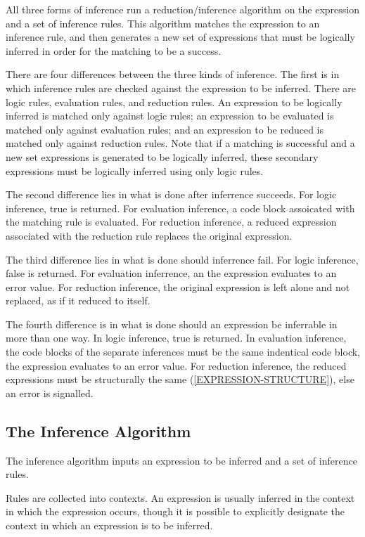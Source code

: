\documentclass[12pt]{article}
\begin{document}
All three forms of inference run a reduction/inference algorithm on the
expression and a set of inference rules.  This algorithm matches
the expression to an inference rule, and then generates a new set of
expressions that must be logically inferred in order for the matching
to be a success.

There are four differences between the three kinds of inference.
The first is in which inference rules are checked against the expression
to be inferred.  There are logic rules, evaluation rules, and reduction
rules.  An expression to be logically inferred is matched only against
logic rules; an expression to be evaluated is matched only against
evaluation rules; and an expression to be reduced is matched only
against reduction rules.  Note that if a matching is successful and a new set
expressions is generated to be logically inferred, these secondary
expressions must be logically inferred using only logic rules.

The second difference lies in what is done after inferrence succeeds.
For logic inference, true is returned.  For evaluation inference, a code
block assoicated with the matching rule is evaluated.  For reduction
inference, a reduced expression associated with the reduction rule replaces
the original expression.

The third difference lies in what is done should inferrence fail.
For logic inference, false is returned.  For evaluation inferrence, an
the expression evaluates to an error value.
For reduction inference, the original expression is left alone and not
replaced, as if it reduced to itself.

The fourth difference is in what is done should an expression be inferrable
in more than one way.  In logic inference, true is returned.  In evaluation
inference, the code blocks of the separate inferences must be the same
indentical code block, the expression evaluates to an error value.
For reduction inference,
the reduced expressions must be structurally the
same (\ref{EXPRESSION-STRUCTURE}), else an error is
signalled.

\subsection{The Inference Algorithm}
\label{INFERENCE-ALGORITHM}

The inference algorithm inputs an expression to be inferred
and a set of inference rules.

Rules are collected into contexts.  An expression is
usually inferred in the context in which the expression occurs,
though it is possible to explicitly designate the context in which an
expression is to be inferred.
\end{document}
